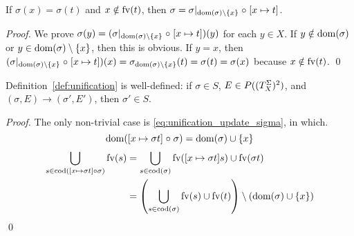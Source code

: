 \documentclass[draft]{llncs}
\begin{document}
\begin{mylemma}\label{lem:x_t}
	If $\sigma (x) = \sigma(t)$ and $x \notin \mathrm{fv}({t})$, then $\sigma = \sigma|_{\mathrm{dom}(\sigma) \setminus \{ x \}} \mathrel{\circ} [x \mapsto t]$.
\end{mylemma}
\begin{proof}
	We prove $\sigma(y) = (\sigma|_{\mathrm{dom}(\sigma) \setminus \{ x \}} \mathrel{\circ} [x \mapsto t])(y)$ for each $y \in X$.
	If $y \notin \mathrm{dom}(\sigma)$ or $y \in \mathrm{dom}(\sigma) \setminus \{ x \}$, then this is obvious.
	If $y = x$, then $(\sigma|_{\mathrm{dom}(\sigma) \setminus \{ x \}} \mathrel{\circ} [x \mapsto t])(x) = \sigma_{\mathrm{dom}(\sigma) \setminus \{ x \}}(t) = \sigma(t) = \sigma(x)$ because $x \notin \mathrm{fv}({t})$.
	\qed
\end{proof}

\begin{mylemma}
	Definition~\ref{def:unification} is well-defined: if $\sigma \in S$, $E \in P((T^{\Sigma}_{X})^2)$, and $(\sigma, E) \to (\sigma', E')$, then $\sigma' \in S$.
\end{mylemma}
\begin{proof}
	The only non-trivial case is \eqref{eq:unification_update_sigma}, in which.
	\[ \mathrm{dom}([x \mapsto \sigma t] \mathrel{\circ} \sigma) = \mathrm{dom}(\sigma) \cup \{ x \} \]
	\begin{align}
		\bigcup_{s \in \mathrm{cod}([x \mapsto \sigma t] \mathrel{\circ} \sigma)} \mathrm{fv}({s}) &= \bigcup_{s \in \mathrm{cod}(\sigma)} \mathrm{fv}({[x \mapsto \sigma t] s}) \cup \mathrm{fv}({\sigma t}) \\
		&= \left( \bigcup_{s \in \mathrm{cod}(\sigma)} \mathrm{fv}({s}) \cup \mathrm{fv}({t}) \right) \setminus (\mathrm{dom}(\sigma) \cup \{ x \})
	\end{align}
	\qed
\end{proof}
\end{document}
